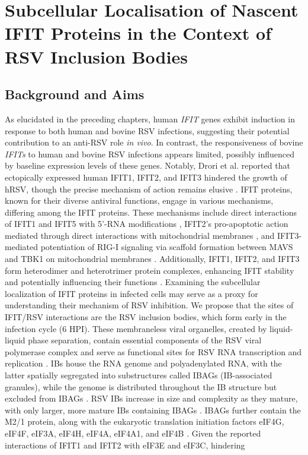 \chapter{Subcellular Localisation of Nascent IFIT Proteins in the Context of RSV Inclusion Bodies} \label{ch:Subcellular Localisation of Nascent IFIT Proteins in the Context of RSV Inclusion Bodies}
\section{Background and Aims} \label{sec:Background and Aims-Chapter3}
As elucidated in the preceding chapters, human \textit{IFIT} genes exhibit induction in response to both human and bovine RSV infections, suggesting their potential contribution to an anti-RSV role \textit{in vivo}. In contrast, the responsiveness of bovine \textit{IFITs} to human and bovine RSV infections appears limited, possibly influenced by baseline expression levels of these genes. Notably, Drori et al. reported that ectopically expressed human IFIT1, IFIT2, and IFIT3 hindered the growth of hRSV, though the precise mechanism of action remains elusive \cite{Drori2020InfluenzaProteins}. IFIT proteins, known for their diverse antiviral functions, engage in various mechanisms, differing among the IFIT proteins. These mechanisms include direct interactions of IFIT1 and IFIT5 with 5'-RNA modifications \cite{Abbas2013StructuralProteins, Diamond2014IFIT1:Translation}, IFIT2's pro-apoptotic action mediated through direct interactions with mitochondrial membranes \cite{Chen2017InhibitionApoptosis}, and IFIT3-mediated potentiation of RIG-I signaling via scaffold formation between MAVS and TBK1 on mitochondrial membranes \cite{Liu2011IFN-InducedTBK1}. Additionally, IFIT1, IFIT2, and IFIT3 form heterodimer and heterotrimer protein complexes, enhancing IFIT stability and potentially influencing their functions \cite{Mears2018BetterResponse}. Examining the subcellular localization of IFIT proteins in infected cells may serve as a proxy for understanding their mechanism of RSV inhibition. We propose that the sites of IFIT/RSV interactions are the RSV inclusion bodies, which form early in the infection cycle (6 HPI). These membraneless viral organelles, created by liquid-liquid phase separation, contain essential components of the RSV viral polymerase complex and serve as functional sites for RSV RNA transcription and replication \cite{Rincheval2017FunctionalVirus, Weber1995NonstructuralSerum, Fricke2013P38Assembly, Jobe2021BovineResponses}. IBs house the RNA genome and polyadenylated RNA, with the latter spatially segregated into substructures called IBAGs (IB-associated granules), while the genome is distributed throughout the IB structure but excluded from IBAGs \cite{Rincheval2017FunctionalVirus}. RSV IBs increase in size and complexity as they mature, with only larger, more mature IBs containing IBAGs \cite{Rincheval2017FunctionalVirus, Jobe2021BovineResponses}. IBAGs further contain the M2/1 protein, along with the eukaryotic translation initiation factors eIF4G, eIF4F, eIF3A, eIF4H, eIF4A, eIF4A1, and eIF4B \cite{Rincheval2017FunctionalVirus, Jobe2023ViralCondensates}. Given the reported interactions of IFIT1 and IFIT2 with eIF3E and eIF3C, hindering 